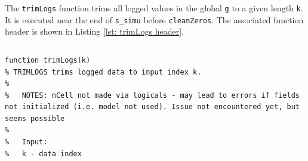 The \verb|trimLogs| function trims all logged values in the global \verb|g| to a given length \verb|k|.
It is executed near the end of \verb|s_simu| before \verb|cleanZeros|.
The associated function header is shown in Listing \ref{lst: trimLogs header}.

\begin{lstlisting}[caption={Function Header for trimLogs},label={lst: trimLogs header}]
\end{lstlisting}\vspace{-2 em}
\begin{verbatim}
function trimLogs(k)
% TRIMLOGS trims logged data to input index k.
%
%   NOTES: nCell not made via logicals - may lead to errors if fields not initialized (i.e. model not used). Issue not encountered yet, but seems possible
%
%   Input:
%   k - data index
\end{verbatim} 
